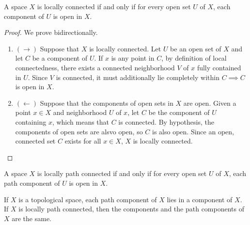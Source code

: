   \begin{theorem}
    A space $X$ is locally connected if and only if for every open set $U$ of $X$, each component of $U$ is open in $X$. 
  \end{theorem}
  \begin{proof}
    We prove bidirectionally. 
    \begin{enumerate}
      \item $(\rightarrow)$ Suppose that $X$ is locally connected. Let $U$ be an open set of $X$ and let $C$ be a component of $U$. If $x$ is any point in $C$, by definition of local connectedness, there exists a connected neighborhood $V$ of $x$ fully contained in $U$. Since $V$ is connected, it must additionally lie completely within $C \implies C$ is open in $X$. 
      \item $(\leftarrow)$ Suppose that the components of open sets in $X$ are open. Given a point $x \in X$ and neighborhood $U$ of $x$, let $C$ be the component of $U$ containing $x$, which means that $C$ is connected. By hypothesis, the components of open sets are alsvo open, so $C$ is also open. Since an open, connected set $C$ exists for all $x \in X$, $X$ is locally connected. 
    \end{enumerate}
  \end{proof}

  \begin{theorem}
    A space $X$ is locally path connected if and only if for every open set $U$ of $X$, each path component of $U$ is open in $X$.
  \end{theorem}

  \begin{theorem}
    If $X$ is a topological space, each path component of $X$ lies in a component of $X$. If $X$ is locally path connected, then the components and the path components of $X$ are the same. 
  \end{theorem}

